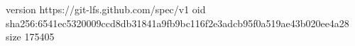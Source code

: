 version https://git-lfs.github.com/spec/v1
oid sha256:6541ec5320009ccd8db31841a9fb9bc116f2e3adcb95f0a519ae43b020ee4a28
size 175405
